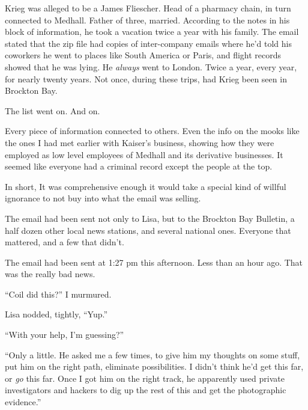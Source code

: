 Krieg was alleged to be a James Fliescher.  Head of a pharmacy chain, in turn connected to Medhall.  Father of three, married.  According to the notes in his block of information, he took a vacation twice a year with his family.  The email stated that the zip file had copies of inter-company emails where he'd told his coworkers he went to places like South America or Paris, and flight records showed that he was lying.  He\emph{ always} went to London.  Twice a year, every year, for nearly twenty years.  Not once, during these trips, had Krieg been seen in Brockton Bay.



The list went on.  And on.



Every piece of information connected to others.  Even the info on the mooks like the ones I had met earlier with Kaiser's business, showing how they were employed as low level employees of Medhall and its derivative businesses.  It seemed like everyone had a criminal record except the people at the top.



In short, It was comprehensive enough it would take a special kind of willful ignorance to not buy into what the email was selling.



The email had been sent not only to Lisa, but to the Brockton Bay Bulletin, a half dozen other local news stations, and several national ones.  Everyone that mattered, and a few that didn't.



The email had been sent at 1:27 pm this afternoon.  Less than an hour ago.  That was the really bad news.



``Coil did this?''  I murmured.



Lisa nodded, tightly, ``Yup.''



``With your help, I'm guessing?''



``Only a little.  He asked me a few times, to give him my thoughts on some stuff, put him on the right path, eliminate possibilities.  I didn't think he'd get this far, or \emph{go} this far.  Once I got him on the right track, he apparently used private investigators and hackers to dig up the rest of this and get the photographic evidence.''



